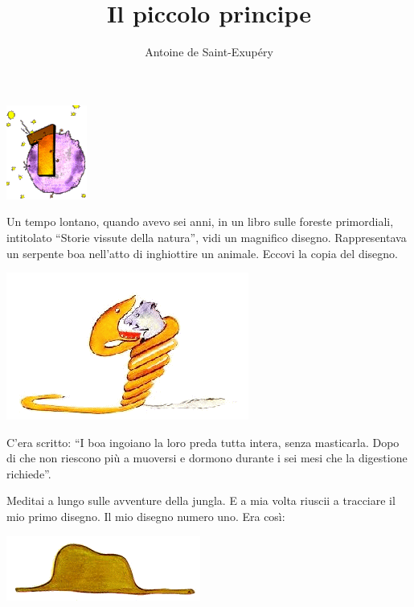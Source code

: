 \documentclass[11pt]{scrbook}
\title{Il piccolo principe}
\author{Antoine de Saint-Exupéry}
\date{}
\begin{document}
\maketitle

\chapter{}
\begin{center}
\includegraphics{img/chapter1}
\end{center}

Un tempo lontano, quando avevo sei anni, in un libro sulle foreste
primordiali, intitolato ``Storie vissute della natura'', vidi un
magnifico disegno. Rappresentava un serpente boa nell'atto di
inghiottire un animale. Eccovi la copia del disegno.

\begin{center}
\includegraphics{img/1a}
\end{center}

C'era scritto: ``I boa ingoiano la loro preda tutta intera, senza
masticarla. Dopo di che non riescono più a muoversi e dormono durante i
sei mesi che la digestione richiede''.

Meditai a lungo sulle avventure della jungla. E a mia volta riuscii a
tracciare il mio primo disegno. Il mio disegno numero uno. Era così:

\begin{center}
\includegraphics{img/sombrero}
\end{center}
\end{document}
